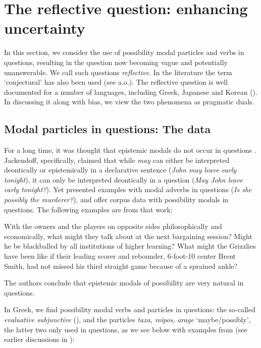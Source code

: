 \documentclass[output=paper,colorlinks,citecolor=brown]{langscibook}
\begin{document}
\section{The reflective question: enhancing uncertainty} \label{sec:02:5}
 
In this section, we consider the use of possibility modal particles and verbs in questions, resulting in the question now becoming vague and potentially unanswerable. We call such questions \textit{reflective}. In the literature the term `conjectural' has also been used (see \citealt{littell2010, matthewson2010, eckardt2019, frana2019a} a.o.).  The reflective question is well documented for a number of languages, including Greek, Japanese and Korean (\citealt{kang2018, kang2019}). In discussing it along with bias, we view the two phenomena as pragmatic duals. 

\subsection{Modal particles in questions: The data}

For a long time, it was thought that epistemic modals do not occur in questions \citep{coates1983, drubig2001, jackendoff1972, leech1971, mcdowell1987}. Jackendoff, specifically, claimed that while \textit{may} can either be interpreted deontically or epistemically in a declarative sentence  (\textit{John may leave early tonight}), it can only be interpreted deontically in a question (\textit{May John leave early tonight?}).  Yet \citet{ernst2009} presented examples with modal adverbs in questions (\textit{Is she possibly the murderer?}), and \citet{hacquard2012} offer corpus data with possibility modals in questions. The following examples are from that work:

\ea 
\ea With the owners and the players on opposite sides philosophically and economically, what might they talk about at the next bargaining session?
\ex Might he be blackballed by all institutions of higher learning?
\ex What might the Grizzlies have been like if their leading scorer and rebounder, 6-foot-10 center Brent Smith, had not missed his third straight game because of a sprained ankle?
\z
\z

The authors conclude that epistemic modals of possibility are very natural in questions. 

In Greek, we find possibility modal verbs and particles in questions: the so-called \textit{evaluative subjunctive} (\citealt{giannakidou2016}), and the particles \textit{taxa, mipos, arage} `maybe/possibly', the latter two only used in questions, as we see below with examples from \citet{giannakidou2016} (see earlier discussions in \citealt{giannakidou2009, rouchota1994}):
\end{document}
